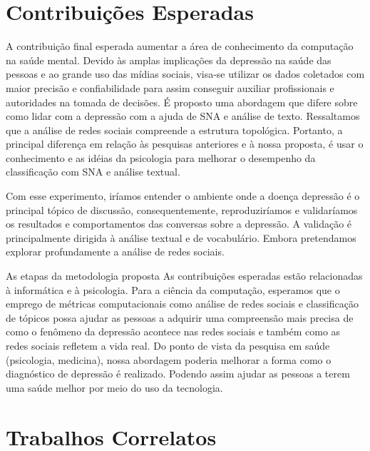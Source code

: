 \documentclass[11pt, notitlepage]{article} %
\begin{document}
\section*{Contribuições Esperadas}
A contribuição final esperada aumentar a área de conhecimento da computação na saúde mental. Devido às amplas implicações da depressão na saúde das pessoas e ao grande uso das mídias sociais, visa-se utilizar os dados coletados com maior precisão e confiabilidade para assim conseguir auxiliar profissionais e autoridades na tomada de decisões.
É proposto uma abordagem que difere sobre como lidar com a depressão com a ajuda de SNA e análise de texto.
Ressaltamos que a análise de redes sociais compreende a estrutura topológica. Portanto, a principal diferença em relação às pesquisas anteriores e à nossa proposta, é usar o conhecimento e as idéias da psicologia para melhorar o desempenho da classificação com SNA e análise textual.

Com esse experimento, iríamos entender o ambiente onde a doença depressão é o principal tópico de discussão, consequentemente, reproduziríamos e validaríamos os resultados e comportamentos das conversas sobre a depressão. A validação é principalmente dirigida à análise textual e de vocabulário. Embora pretendamos explorar profundamente a análise de redes sociais.

As etapas da metodologia proposta  As contribuições esperadas estão relacionadas à informática e à psicologia. Para a ciência da computação, esperamos que o emprego de métricas computacionais como análise de redes sociais e classificação de tópicos possa ajudar as pessoas a adquirir uma compreensão mais precisa de como o fenômeno da depressão acontece nas redes sociais e também como as redes sociais refletem a vida real.
Do ponto de vista da pesquisa em saúde (psicologia, medicina), nossa abordagem poderia melhorar a forma como o diagnóstico de depressão é realizado. Podendo assim ajudar as pessoas a terem uma saúde melhor por meio do uso da tecnologia.

\section*{Trabalhos Correlatos}
\end{document}
